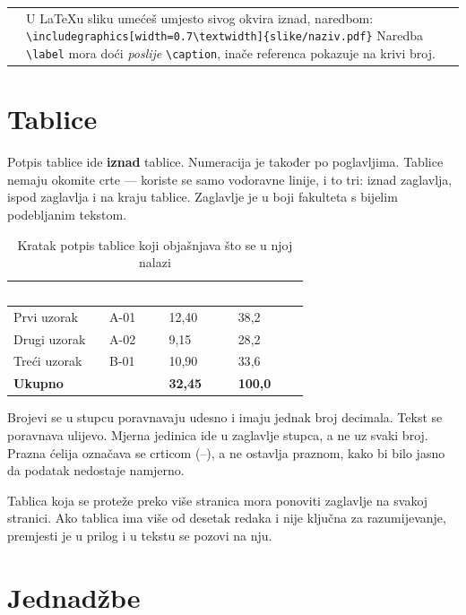 \documentclass[12pt,a4paper,oneside]{report}
\makeatletter
\newcommand{\zaglavlje}[1]{\textbf{\textcolor{white}{#1}}}
\newcommand{\napomena}[1]{%
  \par\vspace{6pt}
  \noindent\begin{tabular}{@{}p{3pt}@{\hspace{10pt}}p{\dimexpr\textwidth-13pt\relax}@{}}
  \cellcolor{fakplava} & \small #1
  \end{tabular}\par\vspace{6pt}}
\makeatother
\begin{document}
\napomena{U LaTeXu sliku umećeš umjesto sivog okvira iznad, naredbom:\newline
\texttt{\footnotesize\textbackslash includegraphics[width=0.7\textbackslash textwidth]\{slike/naziv.pdf\}}\newline
Naredba \texttt{\textbackslash label} mora doći \emph{poslije} \texttt{\textbackslash caption}, inače referenca pokazuje na krivi broj.}

\section{Tablice}

Potpis tablice ide \textbf{iznad} tablice. Numeracija je također po poglavljima. Tablice nemaju okomite crte — koriste se samo vodoravne linije, i to tri: iznad zaglavlja, ispod zaglavlja i na kraju tablice. Zaglavlje je u boji fakulteta s bijelim podebljanim tekstom.

\begin{table}[H]
  \centering
  \caption{Kratak potpis tablice koji objašnjava što se u njoj nalazi}
  \label{tab:primjer}
  \small
  \begin{tabular}{L{4.2cm} C{2.6cm} R{2.6cm} R{2.6cm}}
    \toprule
    \zaglavlje{Naziv uzorka} & \zaglavlje{Oznaka} & \zaglavlje{Masa (g)} & \zaglavlje{Udio (\%)} \\
    \midrule
    Prvi uzorak    & A-01 & 12{,}40 & 38{,}2 \\
    Drugi uzorak   & A-02 &  9{,}15 & 28{,}2 \\
    Treći uzorak   & B-01 & 10{,}90 & 33{,}6 \\
    \midrule
    \textbf{Ukupno} &     & \textbf{32{,}45} & \textbf{100{,}0} \\
    \bottomrule
  \end{tabular}
\end{table}

Brojevi se u stupcu poravnavaju udesno i imaju jednak broj decimala. Tekst se poravnava ulijevo. Mjerna jedinica ide u zaglavlje stupca, a ne uz svaki broj. Prazna ćelija označava se crticom (--), a ne ostavlja praznom, kako bi bilo jasno da podatak nedostaje namjerno.

Tablica koja se proteže preko više stranica mora ponoviti zaglavlje na svakoj stranici. Ako tablica ima više od desetak redaka i nije ključna za razumijevanje, premjesti je u prilog i u tekstu se pozovi na nju.

\section{Jednadžbe}
\end{document}
